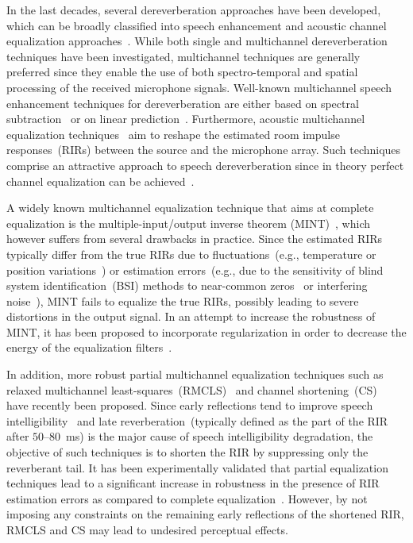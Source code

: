 \documentclass[10pt]{IEEEtran}
\begin{document}
In the last decades, several dereverberation approaches have been developed, which can be broadly classified into speech enhancement and acoustic channel equalization approaches~\cite{Naylor_Derev_book}.
While both single and multichannel dereverberation techniques have been investigated, multichannel techniques are generally preferred since they enable the use of both spectro-temporal and spatial processing of the received microphone signals.
Well-known multichannel speech enhancement techniques for dereverberation are either based on spectral subtraction~\cite{Habets_ITASLP_2008,Habets_ICASSP_2007} or on linear prediction~\cite{Gaubitch_JASA_2006,Delcroix_2007,Nakatani_ITASLP_2010}.
Furthermore, acoustic multichannel equalization techniques~\cite{Miyoshi_ITASS_1988,Kallinger_ICASSP_2006, Hikichi_EURASIP_2007, Mertins_ITASLP_2010, Zhang_IWAENC_2010, Haque_ITASLP_2011, Kodrasi_ICASSP_2012} aim to reshape the estimated room impulse responses~(RIRs) between the source and the microphone array.
Such techniques comprise an attractive approach to speech dereverberation since in theory perfect channel equalization can be achieved~\cite{Miyoshi_ITASS_1988, Hacihabibouglu_ITASLP_2012}.

A widely known multichannel equalization technique that aims at complete equalization is the multiple-input/output inverse theorem (MINT)~\cite{Miyoshi_ITASS_1988}, which however suffers from several drawbacks in practice.
Since the estimated RIRs typically differ from the true RIRs due to fluctuations~(e.g., temperature or position variations~\cite{Radlovic_ITSA_2000}) or estimation errors~(e.g., due to the sensitivity of blind system identification~(BSI) methods to near-common zeros~\cite{Lin_ITASLP_2012} or interfering noise~\cite{Hasan_EUSIPCO_2006}), MINT fails to equalize the true RIRs, possibly leading to severe distortions in the output signal.
In an attempt to increase the robustness of MINT, it has been proposed to incorporate regularization in order to decrease the energy of the equalization filters~\cite{Hikichi_EURASIP_2007}.

In addition, more robust partial multichannel equalization techniques such as relaxed multichannel least-squares~(RMCLS)~\cite{Zhang_IWAENC_2010} and channel shortening~(CS)~\cite{Kallinger_ICASSP_2006} have recently been proposed.
Since early reflections tend to improve speech intelligibility~\cite{Arweiler_JASA_2011,Warzybok_JASA_2012} and late reverberation~(typically defined as the part of the RIR after $50$--$80$~ms) is the major cause of speech intelligibility degradation, the objective of such techniques is to shorten the RIR by suppressing only the reverberant tail.
It has been experimentally validated that partial equalization techniques lead to a significant increase in robustness in the presence of RIR estimation errors as compared to complete equalization~\cite{Zhang_IWAENC_2010}.
However, by not imposing any constraints on the remaining early reflections of the shortened RIR, RMCLS and CS may lead to undesired perceptual effects.
\end{document}
